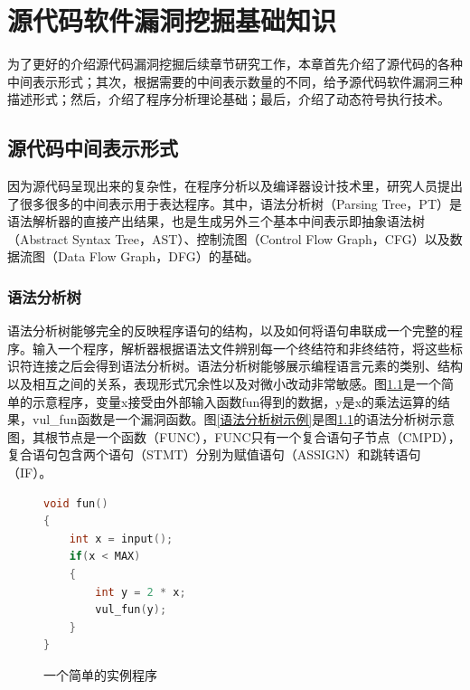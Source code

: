 \chapter{源代码软件漏洞挖掘基础知识}

为了更好的介绍源代码漏洞挖掘后续章节研究工作，本章首先介绍了源代码的各种中间表示形式；其次，根据需要的中间表示数量的不同，给予源代码软件漏洞三种描述形式；然后，介绍了程序分析理论基础；最后，介绍了动态符号执行技术。

%

\section{源代码中间表示形式}

因为源代码呈现出来的复杂性，在程序分析以及编译器设计技术里，研究人员提出了很多很多的中间表示用于表达程序。其中，语法分析树（Parsing Tree，PT）是语法解析器的直接产出结果，也是生成另外三个基本中间表示即抽象语法树（Abstract Syntax Tree，AST）、控制流图（Control Flow Graph，CFG）以及数据流图（Data Flow Graph，DFG）的基础。

\subsection{语法分析树}

语法分析树能够完全的反映程序语句的结构，以及如何将语句串联成一个完整的程序。输入一个程序，解析器根据语法文件辨别每一个终结符和非终结符，将这些标识符连接之后会得到语法分析树。语法分析树能够展示编程语言元素的类别、结构以及相互之间的关系，表现形式冗余性以及对微小改动非常敏感。图\ref{一个简单的实例程序}是一个简单的示意程序，变量x接受由外部输入函数fun得到的数据，y是x的乘法运算的结果，vul\_fun函数是一个漏洞函数。图\ref{语法分析树示例}是图\ref{一个简单的实例程序}的语法分析树示意图，其根节点是一个函数{（FUNC）}，FUNC只有一个复合语句子节点{（CMPD）}，复合语句包含两个语句{（STMT）}分别为赋值语句{（ASSIGN）}和跳转语句{（IF）}。

\begin{figure}[h]
\begin{lstlisting}[language=C]
void fun()
{
	int x = input();
	if(x < MAX)
	{
		int y = 2 * x;
		vul_fun(y);
	}
}
\end{lstlisting}
\caption{一个简单的实例程序}
\label{一个简单的实例程序}
\end{figure}


